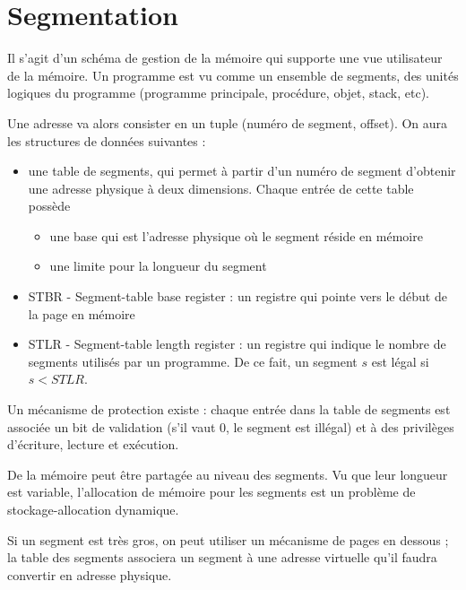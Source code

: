	
	
\section{Segmentation}

Il s'agit d'un schéma de gestion de la mémoire qui supporte une vue utilisateur de la mémoire. Un programme est vu comme un ensemble de segments, des unités logiques du programme (programme principale, procédure, objet, stack, etc).


Une adresse va alors consister en un tuple (numéro de segment, offset). On aura les structures de données suivantes :

\begin{itemize}
	\item une table de segments, qui permet à partir d'un numéro de segment d'obtenir une adresse physique à deux dimensions. Chaque entrée de cette table possède
	
	\begin{itemize}
		\item une base qui est l'adresse physique où le segment réside en mémoire
		\item une limite pour la longueur du segment
	\end{itemize}
	
	\item STBR - Segment-table base register : un registre qui pointe vers le début de la page en mémoire
	\item STLR - Segment-table length register : un registre qui indique le nombre de segments utilisés par un programme. De ce fait, un segment $s$ est légal si $s < STLR$.
\end{itemize}

Un mécanisme de protection existe : chaque entrée dans la table de segments est associée un bit de validation (s'il vaut 0, le segment est illégal) et à des privilèges d'écriture, lecture et exécution.

De la mémoire peut être partagée au niveau des segments. Vu que leur longueur est variable, l'allocation de mémoire pour les segments est un problème de stockage-allocation dynamique.


Si un segment est très gros, on peut utiliser un mécanisme de pages en dessous ; la table des segments associera un segment à une adresse virtuelle qu'il faudra convertir en adresse physique.